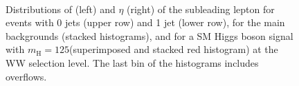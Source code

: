 \begin{figure}
\centering
{}
\\
\caption{Distributions of \pt (left) and $\eta$ (right) of the subleading lepton for events with 0 jets (upper row) and 1 jet (lower row), for the main backgrounds (stacked histograms), and for a SM Higgs boson signal with $m_\mathrm{H}=125$\GeV (superimposed and stacked red histogram) at the WW selection level. The last bin of the histograms includes overflows.}\label{fig:distr2}
\end{figure}

